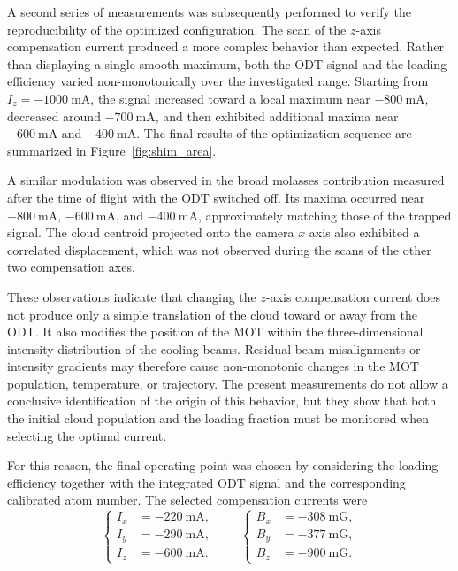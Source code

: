 A second series of measurements was subsequently performed to verify the reproducibility of the optimized configuration. The scan of the $z$-axis compensation current produced a more complex behavior than expected. Rather than displaying a single smooth maximum, both the ODT signal and the loading efficiency varied non-monotonically over the investigated range. Starting from $I_z=-1000~\mathrm{mA}$, the signal increased toward a local maximum near $-800~\mathrm{mA}$, decreased around $-700~\mathrm{mA}$, and then exhibited additional maxima near $-600~\mathrm{mA}$ and $-400~\mathrm{mA}$. The final results of the optimization sequence are summarized in Figure~\ref{fig:shim_area}.

A similar modulation was observed in the broad molasses contribution measured after the time of flight with the ODT switched off. Its maxima occurred near $-800~\mathrm{mA}$, $-600~\mathrm{mA}$, and $-400~\mathrm{mA}$, approximately matching those of the trapped signal. The cloud centroid projected onto the camera $x$ axis also exhibited a correlated displacement, which was not observed during the scans of the other two compensation axes.

These observations indicate that changing the $z$-axis compensation current does not produce only a simple translation of the cloud toward or away from the ODT. It also modifies the position of the MOT within the three-dimensional intensity distribution of the cooling beams. Residual beam misalignments or intensity gradients may therefore cause non-monotonic changes in the MOT population, temperature, or trajectory. The present measurements do not allow a conclusive identification of the origin of this behavior, but they show that both the initial cloud population and the loading fraction must be monitored when selecting the optimal current.

For this reason, the final operating point was chosen by considering the loading efficiency together with the integrated ODT signal and the corresponding calibrated atom number. The selected compensation currents were
\begin{equation}
    \begin{cases}
        I_x &= -220~\mathrm{mA}, \\
        I_y &= -290~\mathrm{mA}, \\
        I_z &= -600~\mathrm{mA}.
    \end{cases}
    \qquad
    \begin{cases}
        B_x &= -308~\mathrm{mG}, \\
        B_y &= -377~\mathrm{mG}, \\
        B_z &= -900~\mathrm{mG}.
    \end{cases}
    \label{eq:odt_final_optimized_currents}
\end{equation}

